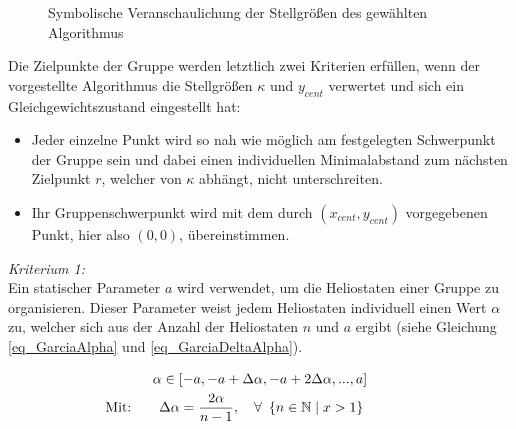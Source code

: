 \begin{figure}[h!]
    \centering
    \setlength{\fboxsep}{1pt}
    \setlength{\fboxrule}{1pt}
    \caption[Symbolische Veranschaulichung der Stellgrößen des gewählten Algorithmus]{Symbolische Veranschaulichung der Stellgrößen des gewählten Algorithmus \cite[S.7]{Garcia2}}
    \label{fig_DispersionVeranschaulichung}
\end{figure}


Die Zielpunkte der Gruppe werden letztlich zwei Kriterien erfüllen, wenn der vorgestellte Algorithmus die Stellgrößen $\kappa$ und $y_{cent}$ verwertet und sich ein Gleichgewichtszustand eingestellt hat:
\begin{itemize}
    \item Jeder einzelne Punkt wird so nah wie möglich am festgelegten Schwerpunkt der Gruppe sein und dabei einen individuellen Minimalabstand zum nächsten Zielpunkt $r$, welcher von $\kappa$ abhängt, nicht unterschreiten.
    \item Ihr Gruppenschwerpunkt wird mit dem durch $(x_{cent}, y_{cent})$ vorgegebenen Punkt, hier also $(0,0)$, übereinstimmen.
\end{itemize}

\textit{Kriterium 1:}\\
Ein statischer Parameter $a$ wird verwendet, um die Heliostaten einer Gruppe zu organisieren. Dieser Parameter weist jedem Heliostaten individuell einen Wert $\alpha$ zu, welcher sich aus der Anzahl der Heliostaten $n$ und $a$ ergibt (siehe Gleichung \ref{eq_GarciaAlpha} und \ref{eq_GarciaDeltaAlpha}).

\begin{gather}
    \alpha \in \left[-a, -a+\Delta\alpha, -a+2\Delta\alpha,..., a\right] \label{eq_GarciaAlpha}\\
    \text{\myequations{\quad Berechnung des individuellen Heliostatenparameters $\alpha$}}
    \text{Mit:\qquad}\Delta\alpha = \frac{2\alpha}{n-1}, \quad \forall~\left\{n \in \mathbb{N} \mid x > 1 \right\} \qquad\qquad \label{eq_GarciaDeltaAlpha}
\end{gather}

